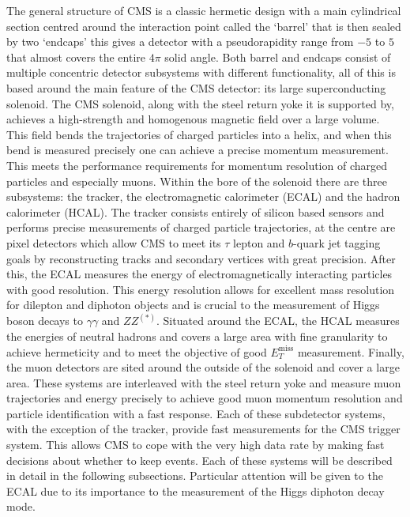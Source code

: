 The general structure of CMS is a classic hermetic design with a main cylindrical section centred around the interaction point called the `barrel' that is then sealed by two `endcaps' this gives a detector with a pseudorapidity range from $-5$ to $5$ that almost covers the entire $4\pi$ solid angle. Both barrel and endcaps consist of multiple concentric detector subsystems with different functionality, all of this is based around the main feature of the CMS detector: its large superconducting solenoid. 
The CMS solenoid, along with the steel return yoke it is supported by, achieves a high-strength and homogenous magnetic field over a large volume. This field bends the trajectories of charged particles into a helix, and when this bend is measured precisely one can achieve a precise momentum measurement. This meets the performance requirements for momentum resolution of charged particles and especially muons. Within the bore of the solenoid there are three subsystems: the tracker, the electromagnetic calorimeter (ECAL) and the hadron calorimeter (HCAL). The tracker consists entirely of silicon based sensors and performs precise measurements of charged particle trajectories, at the centre are pixel detectors which allow CMS to meet its $\tau$ lepton and $b$-quark jet tagging goals by reconstructing tracks and secondary vertices with great precision. 
After this, the ECAL measures the energy of electromagnetically interacting particles with good resolution. This energy resolution allows for excellent mass resolution for dilepton and diphoton objects and is crucial to the measurement of Higgs boson decays to $\gamma\gamma$ and $ZZ^{(*)}$.
Situated around the ECAL, the HCAL measures the energies of neutral hadrons and covers a large area with fine granularity to achieve hermeticity and to meet the objective of good $E_{T}^{\mathrm{miss}}$ measurement.
Finally, the muon detectors are sited around the outside of the solenoid and cover a large area. These systems are interleaved with the steel return yoke and measure muon trajectories and energy precisely to achieve good muon momentum resolution and particle identification with a fast response. 
Each of these subdetector systems, with the exception of the tracker, provide fast measurements for the CMS trigger system. This allows CMS to cope with the very high data rate by making fast decisions about whether to keep events.
Each of these systems will be described in detail in the following subsections. Particular attention will be given to the ECAL due to its importance to the measurement of the Higgs diphoton decay mode. 


